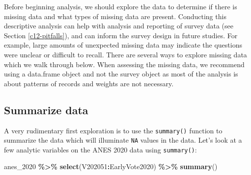 \documentclass[
]{krantz}
\makeatletter
\newenvironment{Shaded}{\begin{snugshade}}{\end{snugshade}}
\newcommand{\FunctionTok}[1]{\textcolor[rgb]{0.27,0.27,0.27}{\textbf{#1}}}
\newcommand{\NormalTok}[1]{#1}
\newcommand{\SpecialCharTok}[1]{\textcolor[rgb]{0.43,0.43,0.43}{\textbf{#1}}}
\newenvironment{kframe}{%
\medskip{}
\setlength{\fboxsep}{.8em}
 \def\at@end@of@kframe{}%
 \ifinner\ifhmode%
  \def\at@end@of@kframe{\end{minipage}}%
  \begin{minipage}{\columnwidth}%
 \fi\fi%
 \def\FrameCommand##1{\hskip\@totalleftmargin \hskip-\fboxsep
 \colorbox{shadecolor}{##1}\hskip-\fboxsep
     \hskip-\linewidth \hskip-\@totalleftmargin \hskip\columnwidth}%
 \MakeFramed {\advance\hsize-\width
   \@totalleftmargin\z@ \linewidth\hsize
   \@setminipage}}%
 {\par\unskip\endMakeFramed%
 \at@end@of@kframe}
\renewenvironment{Shaded}{\begin{kframe}}{\end{kframe}}
\makeatother
\begin{document}
Before beginning analysis, we should explore the data to determine if there is missing data and what types of missing data are present. Conducting this descriptive analysis can help with analysis and reporting of survey data (see Section \ref{c12-pitfalls}), and can inform the survey design in future studies. For example, large amounts of unexpected missing data may indicate the questions were unclear or difficult to recall. There are several ways to explore missing data which we walk through below. When assessing the missing data, we recommend using a data.frame object and not the survey object as most of the analysis is about patterns of records and weights are not necessary.

\hypertarget{summarize-data}{%
\subsection{Summarize data}\label{summarize-data}}

A very rudimentary first exploration is to use the \texttt{summary()} function to summarize the data which will illuminate \texttt{NA} values in the data. Let's look at a few analytic variables on the ANES 2020 data using \texttt{summary()}:

\begin{Shaded}
\begin{Highlighting}[]
\NormalTok{anes\_2020 }\SpecialCharTok{\%\textgreater{}\%}
  \FunctionTok{select}\NormalTok{(V202051}\SpecialCharTok{:}\NormalTok{EarlyVote2020) }\SpecialCharTok{\%\textgreater{}\%}
  \FunctionTok{summary}\NormalTok{()}
\end{Highlighting}
\end{Shaded}
\end{document}
